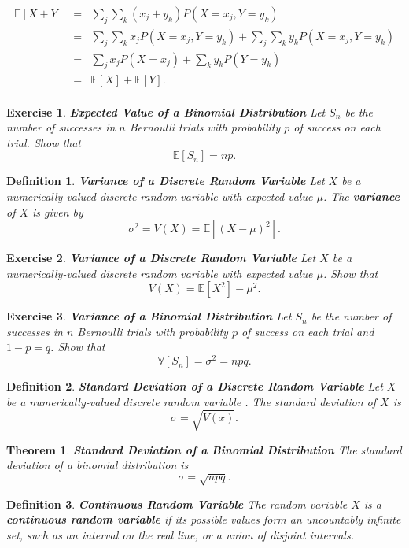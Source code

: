 \documentclass[letterpaper,10pt]{article}
\newcommand{\Sum}[2]{\ensuremath{\sum\limits}_{#1}^{#2}}
\newtheorem{thm}{Theorem}
\newtheorem{df}{Definition}[section]
\newtheorem{ex}{Exercise}
\begin{document}
\begin{eqnarray*}
\mathbb{E}[X+Y]&=&\Sum{j}{}\Sum{k}{}(x_j+y_k)P(X=x_j,Y=y_k)\\
&=&\Sum{j}{}\Sum{k}{}x_jP(X=x_j,Y=y_k)+\Sum{j}{}\Sum{k}{}y_kP(X=x_j,Y=y_k)\\
&=&\Sum{j}{}x_jP(X=x_j)+\Sum{k}{}y_kP(Y=y_k)\\
&=&\mathbb{E}[X]+\mathbb{E}[Y].\\
\end{eqnarray*}

\begin{ex}{\bf Expected Value of a Binomial Distribution}
Let $S_n$ be the number of successes in $n$ Bernoulli trials with probability $p$ of success on each trial.  Show that $$\mathbb{E}[S_n]=np.$$
\end{ex}

\begin{df}{\bf Variance of a Discrete Random Variable}
Let $X$ be a numerically-valued discrete random variable with expected value $\mu$.  The {\bf variance} of $X$ is given by $$\sigma^2=V(X)=\mathbb{E}[(X-\mu)^2].$$  
\end{df}

\begin{ex}{\bf Variance of a Discrete Random Variable}
Let $X$ be a numerically-valued discrete random variable with expected value $\mu$. Show that $$V(X)=\mathbb{E}[X^2]-\mu^2.$$
\end{ex}

\begin{ex}{\bf Variance of a Binomial Distribution}
Let $S_n$ be the number of successes in $n$ Bernoulli trials with probability $p$ of success on each trial and $1-p=q$.  Show that $$\mathbb{V}[S_n]=\sigma^2=npq.$$
\end{ex}

\begin{df}{\bf Standard Deviation of a Discrete Random Variable}
Let $X$ be a numerically-valued discrete random variable . The standard deviation of $X$ is $$\sigma=\sqrt{V(x)}.$$
\end{df}

\begin{thm}{\bf Standard Deviation of a Binomial Distribution}
The standard deviation of a binomial distribution is $$\sigma=\sqrt{npq}.$$
\end{thm}


\begin{df}{\bf Continuous Random Variable}
The random variable $X$ is a {\bf continuous random variable} if its possible values form an uncountably infinite set, such as an interval on the real line, or a union of disjoint intervals.
\end{df}
\end{document}
